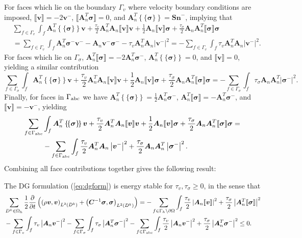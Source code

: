 \documentclass{siamart0216}
\newcommand{\pd}[2]{\frac{\partial#1}{\partial#2}}
\newcommand{\LRp}[1]{\left( #1 \right)}
\newcommand{\LRb}[1]{\left| #1 \right|}
\newcommand{\LRc}[1]{\left\{ #1 \right\}}
\newcommand{\jump}[1] {\ensuremath{\llbracket#1\rrbracket}}
\newcommand{\avg}[1] {\ensuremath{\LRc{\!\{#1\}\!}}}
\newcommand{\Oh}{{\Omega_h}}
\newcommand{\Lk}{L^2\LRp{D^k}}
\begin{document}
For faces which lie on the boundary $\Gamma_v$ where velocity boundary conditions are imposed, $\jump{\bm{v}} = -2\bm{v}^-$, $\jump{\bm{A}_n^T\bm{\sigma}} = 0$, and $\bm{A}_n^T\avg{\bm{\sigma}} = \bm{Sn}^-$, implying that 
\begin{align*}
&\sum_{f\in \Gamma_v} \int_f \bm{A}_n^T\avg{\bm{\sigma}}\bm{v} + \frac{\tau_v}{2}\bm{A}_n^T\bm{A}_n\jump{\bm{v}}\bm{v} + \frac{1}{2}\bm{A}_n\jump{\bm{v}}\bm{\sigma} + \frac{\tau_\sigma}{2}\bm{A}_n\bm{A}_n^T\jump{\bm{\sigma}}\bm{\sigma}\\
&= \sum_{f\in \Gamma_v} \int_f \bm{A}_n^T \bm{\sigma}^-\bm{v}^- - \bm{A}_n \bm{v}^- \bm{\sigma}^- - \tau_v \bm{A}_n^T\bm{A}_n \LRb{\bm{v}^-}^2 = - \sum_{f\in \Gamma_v} \int_f \tau_v \bm{A}_n^T\bm{A}_n \LRb{\bm{v}^-}^2 .
\end{align*}
For faces which lie on $\Gamma_\sigma$, $\bm{A}_n^T\jump{\bm{\sigma}} = -2\bm{A}_n^T\bm{\sigma}^-$, $\bm{A}_n^T\avg{\bm{\sigma}} = 0$, and $\jump{\bm{v}} = 0$, yielding a similar contribution
\[
\sum_{f\in \Gamma_\sigma} \int_f \bm{A}_n^T\avg{\bm{\sigma}}\bm{v} + \frac{\tau_v}{2}\bm{A}_n^T\bm{A}_n\jump{\bm{v}}\bm{v} + \frac{1}{2}\bm{A}_n\jump{\bm{v}}\bm{\sigma} + \frac{\tau_\sigma}{2}\bm{A}_n\bm{A}_n^T\jump{\bm{\sigma}}\bm{\sigma} = - \sum_{f\in \Gamma_\sigma} \int_f \tau_\sigma \bm{A}_n\bm{A}_n^T \LRb{\bm{\sigma}^-}^2.
\]
Finally, for faces in $\Gamma_{\rm abc}$ we have $\bm{A}_n^T\avg{\bm{\sigma}} =\frac{1}{2} \bm{A}_n^T\bm{\sigma}^- $, $\bm{A}_n^T\jump{\bm{\sigma}} = -\bm{A}_n^T\bm{\sigma}^-$, and $\jump{\bm{v}} = -\bm{v}^-$, yielding
\begin{align*}
\sum_{f\in \Gamma_{\rm abc}} &\int_f \bm{A}_n^T\avg{\bm{\sigma}}\bm{v} + \frac{\tau_v}{2}\bm{A}_n^T\bm{A}_n\jump{\bm{v}}\bm{v} + \frac{1}{2}\bm{A}_n\jump{\bm{v}}\bm{\sigma} + \frac{\tau_\sigma}{2}\bm{A}_n\bm{A}_n^T\jump{\bm{\sigma}}\bm{\sigma} =\\
& - \sum_{f\in \Gamma_{\rm abc}} \int_f \frac{\tau_v}{2} \bm{A}_n^T\bm{A}_n \LRb{\bm{v}^-}^2 + \frac{\tau_\sigma}{2} \bm{A}_n\bm{A}_n^T \LRb{\bm{\sigma}^-}^2.  
\end{align*}
Combining all face contributions together gives the following result:
\begin{theorem}
The DG formulation (\ref{eq:dgform}) is energy stable for $\tau_v,\tau_\sigma \geq 0$, in the sense that
\begin{align}
&\sum_{D^k\in \Oh} \frac{1}{2}\pd{}{t}\LRp{\LRp{\rho \bm{v},\bm{v}}_{\Lk} + \LRp{\bm{C}^{-1} \bm{\sigma},\bm{\sigma}}_{\Lk}} = - \sum_{f \in\Gamma_h \setminus \partial \Omega} \int_{f} \frac{\tau_v}{2}\LRb{\bm{A}_n\jump{\bm{v}}}^2 + \frac{\tau_\sigma}{2}\LRb{\bm{A}_n^T\jump{\bm{\sigma}}}^2\nonumber\\
& - \sum_{f\in \Gamma_v} \int_f \tau_v  \LRb{\bm{A}_n\bm{v}^-}^2  - \sum_{f\in \Gamma_\sigma} \int_f \tau_\sigma  \LRb{\bm{A}_n^T\bm{\sigma}^-}^2- \sum_{f\in \Gamma_{\rm abc}} \int_f \frac{\tau_v}{2} \LRb{\bm{A}_n\bm{v}^-}^2 + \frac{\tau_\sigma}{2} \LRb{\bm{A}_n^T\bm{\sigma}^-}^2 \leq 0.  
\label{eq:thm:stability}
\end{align}
\label{thm:stability}
\end{theorem}
\end{document}
